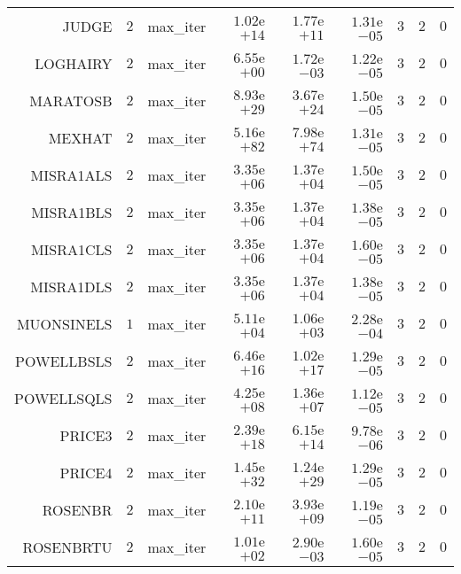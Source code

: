 \begin{longtable}{rrrrrrrrr}
JUDGE & \(     2\) & max\_iter & \( 1.02\)e\(+14\) & \( 1.77\)e\(+11\) & \( 1.31\)e\(-05\) & \(     3\) & \(     2\) & \(     0\) \\
LOGHAIRY & \(     2\) & max\_iter & \( 6.55\)e\(+00\) & \( 1.72\)e\(-03\) & \( 1.22\)e\(-05\) & \(     3\) & \(     2\) & \(     0\) \\
MARATOSB & \(     2\) & max\_iter & \( 8.93\)e\(+29\) & \( 3.67\)e\(+24\) & \( 1.50\)e\(-05\) & \(     3\) & \(     2\) & \(     0\) \\
MEXHAT & \(     2\) & max\_iter & \( 5.16\)e\(+82\) & \( 7.98\)e\(+74\) & \( 1.31\)e\(-05\) & \(     3\) & \(     2\) & \(     0\) \\
MISRA1ALS & \(     2\) & max\_iter & \( 3.35\)e\(+06\) & \( 1.37\)e\(+04\) & \( 1.50\)e\(-05\) & \(     3\) & \(     2\) & \(     0\) \\
MISRA1BLS & \(     2\) & max\_iter & \( 3.35\)e\(+06\) & \( 1.37\)e\(+04\) & \( 1.38\)e\(-05\) & \(     3\) & \(     2\) & \(     0\) \\
MISRA1CLS & \(     2\) & max\_iter & \( 3.35\)e\(+06\) & \( 1.37\)e\(+04\) & \( 1.60\)e\(-05\) & \(     3\) & \(     2\) & \(     0\) \\
MISRA1DLS & \(     2\) & max\_iter & \( 3.35\)e\(+06\) & \( 1.37\)e\(+04\) & \( 1.38\)e\(-05\) & \(     3\) & \(     2\) & \(     0\) \\
MUONSINELS & \(     1\) & max\_iter & \( 5.11\)e\(+04\) & \( 1.06\)e\(+03\) & \( 2.28\)e\(-04\) & \(     3\) & \(     2\) & \(     0\) \\
POWELLBSLS & \(     2\) & max\_iter & \( 6.46\)e\(+16\) & \( 1.02\)e\(+17\) & \( 1.29\)e\(-05\) & \(     3\) & \(     2\) & \(     0\) \\
POWELLSQLS & \(     2\) & max\_iter & \( 4.25\)e\(+08\) & \( 1.36\)e\(+07\) & \( 1.12\)e\(-05\) & \(     3\) & \(     2\) & \(     0\) \\
PRICE3 & \(     2\) & max\_iter & \( 2.39\)e\(+18\) & \( 6.15\)e\(+14\) & \( 9.78\)e\(-06\) & \(     3\) & \(     2\) & \(     0\) \\
PRICE4 & \(     2\) & max\_iter & \( 1.45\)e\(+32\) & \( 1.24\)e\(+29\) & \( 1.29\)e\(-05\) & \(     3\) & \(     2\) & \(     0\) \\
ROSENBR & \(     2\) & max\_iter & \( 2.10\)e\(+11\) & \( 3.93\)e\(+09\) & \( 1.19\)e\(-05\) & \(     3\) & \(     2\) & \(     0\) \\
ROSENBRTU & \(     2\) & max\_iter & \( 1.01\)e\(+02\) & \( 2.90\)e\(-03\) & \( 1.60\)e\(-05\) & \(     3\) & \(     2\) & \(     0\) \\

\end{longtable}
